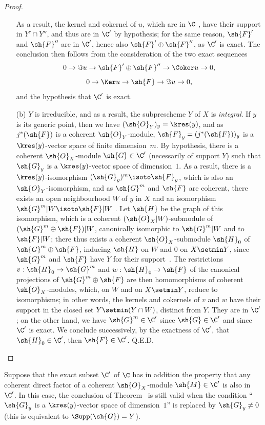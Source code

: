 \begin{proof}
\begin{enumerate}
    As a result, the kernel and cokernel of $u$, which are in $\C$ , have their support in $Y'\cap Y''$, and thus are in $\C'$ by hypothesis; for the same reason, $\sh{F}'$ and $\sh{F}''$ are in $\C'$, hence also $\sh{F}'\oplus\sh{F}''$, as $\C'$ is exact.
    The conclusion then follows from the consideration of the two exact sequences
    \[
      0\to\Im u\to\sh{F}'\oplus\sh{F}''\to\Coker u\to 0,
    \]
    \[
      0\to\Ker u\to\sh{F}\to\Im u\to 0,
    \]
    and the hypothesis that $\C'$ is exact.
  \item[(b)] $Y$ is irreducible, and as a result, the subprescheme $Y$ of $X$ is \emph{integral}.
    If $y$ is its generic point, then we have $(\sh{O}_Y)_y=\kres(y)$, and as $j^*(\sh{F})$ is a coherent $\sh{O}_Y$-module, $\sh{F}_y=(j^*(\sh{F}))_y$ is a $\kres(y)$-vector space of finite dimension~$m$.
    By hypothesis, there is a coherent $\sh{O}_X$-module $\sh{G}\in\C'$ (necessarily of support $Y$) such that $\sh{G}_y$ is a $\kres(y)$-vector space of dimension~$1$.
    As a result, there is a $\kres(y)$-isomorphism $(\sh{G}_y)^m\isoto\sh{F}_y$, which is also an $\sh{O}_Y$-isomorphism, and as $\sh{G}^m$ and $\sh{F}$ are coherent, there exists an open neighbourhood $W$ of $y$ in $X$ and an isomorphism $\sh{G}^m|W\isoto\sh{F}|W$ .
    Let $\sh{H}$ be the graph of this isomorphism, which is a coherent $(\sh{O}_X|W)$-submodule of $(\sh{G}^m\oplus\sh{F})|W$, canonically isomorphic to $\sh{G}^m|W$ and to $\sh{F}|W$; there thus exists a coherent $\sh{O}_X$-submodule $\sh{H}_0$ of $\sh{G}^m\oplus\sh{F}$, inducing $\sh{H}$ on $W$ and $0$ on $X\setmin Y$, since $\sh{G}^m$ and $\sh{F}$ have $Y$ for their support~.
    The restrictions $v:\sh{H}_0\to\sh{G}^m$ and $w:\sh{H}_0\to\sh{F}$ of the canonical projections of $\sh{G}^m\oplus\sh{F}$ are then homomorphisms of coherent $\sh{O}_X$-modules, which, on $W$ and on $X\setmin Y$, reduce to isomorphisms; in other words, the kernels and cokernels of $v$ and $w$ have their support in the closed set $Y\setmin(Y\cap W)$, distinct from $Y$.
    They are in $\C'$; on the other hand, we have $\sh{G}^m\in\C'$ since $\sh{G}\in\C'$ and since $\C'$ is exact.
    We conclude successively, by the exactness of $\C'$, that $\sh{H}_0\in\C'$, then $\sh{F}\in\C'$.
Q.E.D.
\end{enumerate}
\end{proof}

\begin{corollary}[3.1.3]
\label{III.3.1.3}
Suppose that the exact subset $\C'$ of $\C$ has in addition the property that any coherent direct factor of a coherent $\sh{O}_X$-module $\sh{M}\in\C'$ is also in $\C'$.
In this case, the conclusion of Theorem~ is still valid when the condition ``$\sh{G}_y$ is a $\kres(y)$-vector space of dimension~$1$'' is replaced by $\sh{G}_y\neq 0$ (this is equivalent to $\Supp(\sh{G})=Y$).
\end{corollary}

